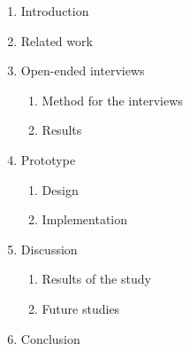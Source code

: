 \documentclass[12pt,a4paper,finnish,oneside]{article}
\begin{document}
\begin{enumerate}
\item Introduction
\item Related work
\item Open-ended interviews
\begin{enumerate}
	\item Method for the interviews
	\item Results
\end{enumerate}
\item Prototype
	\begin{enumerate}
	\item Design
	\item Implementation
	\end{enumerate}
\item Discussion
	\begin{enumerate}
	\item Results of the study
	\item Future studies
	\end{enumerate}
\item Conclusion
\end{enumerate}

%


% 

\renewcommand{\refname}{References}  %



\end{document}
